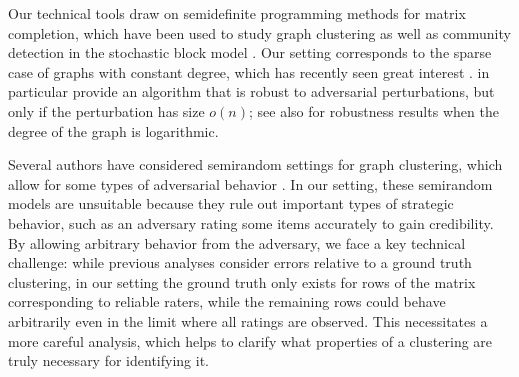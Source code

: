 Our technical tools draw on semidefinite programming methods for matrix 
completion, which have been used to study graph clustering as well 
as community detection in the stochastic block model . 
Our setting corresponds to the sparse case of graphs with constant degree, 
which has recently seen great interest . 
 in particular provide an algorithm that is 
robust to adversarial perturbations, but only if the perturbation has 
size $o(n)$; see also  for robustness results when 
the degree of the graph is logarithmic.

Several authors have considered semirandom settings for graph clustering, which 
allow for some types of adversarial behavior . 
In our setting, these semirandom models are unsuitable because they rule out 
important types of strategic behavior, such as an adversary rating some items 
accurately to gain credibility.
By allowing arbitrary behavior from the adversary, 
we face a key technical challenge: while previous 
analyses consider errors relative to a ground truth clustering, 
in our setting 
the ground truth only exists for rows of the matrix corresponding to reliable 
raters, while the remaining rows could behave arbitrarily even in the limit 
where all ratings are observed. This necessitates a more careful analysis, 
which helps to clarify what properties of a clustering are truly necessary 
for identifying it.


